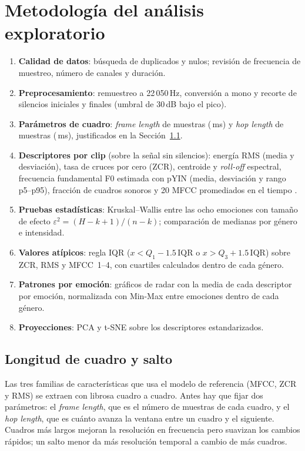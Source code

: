 \documentclass[11pt,a4paper]{article}
\begin{document}
\section{Metodología del análisis exploratorio}

\begin{enumerate}[label=\arabic*.]
  \item \textbf{Calidad de datos}: búsqueda de duplicados y nulos; revisión de frecuencia de muestreo,
        número de canales y duración.
  \item \textbf{Preprocesamiento}: remuestreo a 22\,050\,Hz, conversión a mono y recorte de silencios
        iniciales y finales (umbral de 30\,dB bajo el pico).
  \item \textbf{Parámetros de cuadro}: \emph{frame length} de \frameLen{} muestras (\ventanaMs\,ms) y
        \emph{hop length} de \hopLen{} muestras (\saltoMs\,ms), justificados en la
        Sección~\ref{sec:framehop}.
  \item \textbf{Descriptores por clip} (sobre la señal sin silencios): energía RMS (media y desviación),
        tasa de cruces por cero (ZCR), centroide y \emph{roll-off} espectral, frecuencia fundamental F0
        estimada con pYIN (media, desviación y rango p5--p95), fracción de cuadros sonoros y 20 MFCC
        promediados en el tiempo \cite{mcfee2015}.
  \item \textbf{Pruebas estadísticas}: Kruskal--Wallis entre las ocho emociones con tamaño de efecto
        $\varepsilon^2=(H-k+1)/(n-k)$; comparación de medianas por género e intensidad.
  \item \textbf{Valores atípicos}: regla IQR ($x<Q_1-1.5\,\mathrm{IQR}$ o $x>Q_3+1.5\,\mathrm{IQR}$) sobre
        ZCR, RMS y MFCC~1--4, con cuartiles calculados dentro de cada género.
  \item \textbf{Patrones por emoción}: gráficos de radar con la media de cada descriptor por emoción,
        normalizada con Min-Max entre emociones dentro de cada género.
  \item \textbf{Proyecciones}: PCA y t-SNE sobre los descriptores estandarizados.
\end{enumerate}

\subsection{Longitud de cuadro y salto}
\label{sec:framehop}

Las tres familias de características que usa el modelo de referencia \cite{kaggleref} (MFCC, ZCR y RMS) se
extraen con librosa \cite{mcfee2015} cuadro a cuadro. Antes hay que fijar dos parámetros: el
\emph{frame length}, que es el número de muestras de cada cuadro, y el \emph{hop length}, que es cuánto
avanza la ventana entre un cuadro y el siguiente. Cuadros más largos mejoran la resolución en frecuencia
pero suavizan los cambios rápidos; un salto menor da más resolución temporal a cambio de más cuadros.
\end{document}
